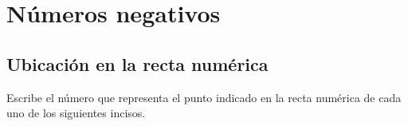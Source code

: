 \documentclass[12pt,addpoints]{evalua}
\begin{document}
\begin{questions}
\begin{multicols}{2}
      \end{multicols}


      
	\section*{Números negativos}
      
	\subsection*{Ubicación en la recta numérica}

      \question[4] Escribe el número que representa el punto indicado en la recta numérica de cada uno de los siguientes incisos.

      \begin{multicols}{2}
\end{multicols}
\end{questions}
\end{document}
